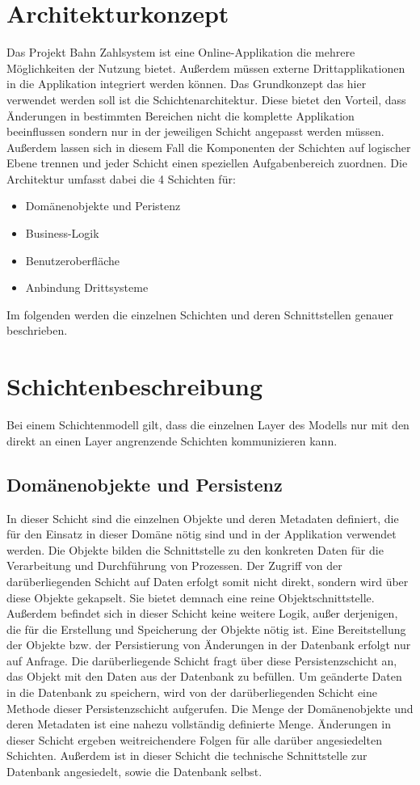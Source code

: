 \documentclass[a4paper,12pt]{article} %
\begin{document}
\section{Architekturkonzept}
Das Projekt \glqq{}Bahn Zahlsystem\grqq{} ist eine Online-Applikation die mehrere Möglichkeiten der Nutzung bietet. Außerdem müssen externe Drittapplikationen in die Applikation integriert werden können. Das Grundkonzept das hier verwendet werden soll ist die Schichtenarchitektur. Diese bietet den Vorteil, dass Änderungen in bestimmten Bereichen nicht die komplette Applikation beeinflussen sondern nur in der jeweiligen Schicht angepasst werden müssen. Außerdem lassen sich in diesem Fall die Komponenten der Schichten auf logischer Ebene trennen und jeder Schicht einen speziellen Aufgabenbereich zuordnen. Die Architektur umfasst dabei die 4 Schichten für:
\begin{itemize}\itemsep2pt
 \item Domänenobjekte und Peristenz
 \item Business-Logik
 \item Benutzeroberfläche
 \item Anbindung Drittsysteme
\end{itemize}
Im folgenden werden die einzelnen Schichten und deren Schnittstellen genauer beschrieben.

\section{Schichtenbeschreibung}
Bei einem Schichtenmodell gilt, dass die einzelnen Layer des Modells nur mit den direkt an einen Layer angrenzende Schichten kommunizieren kann.

\subsection{Domänenobjekte und Persistenz}
In dieser Schicht sind die einzelnen Objekte und deren Metadaten definiert, die für den Einsatz in dieser Domäne nötig sind und in der Applikation verwendet werden. Die Objekte bilden die Schnittstelle zu den konkreten Daten für die Verarbeitung und Durchführung von Prozessen. Der Zugriff von der darüberliegenden Schicht auf Daten erfolgt somit nicht direkt, sondern wird über diese Objekte gekapselt. Sie bietet demnach eine reine Objektschnittstelle. Außerdem befindet sich in dieser Schicht keine weitere Logik, außer derjenigen, die für die Erstellung und Speicherung der Objekte nötig ist.\newline
Eine Bereitstellung der Objekte bzw. der Persistierung von Änderungen in der Datenbank erfolgt nur auf Anfrage. Die darüberliegende Schicht fragt über diese Persistenzschicht an, das Objekt mit den Daten aus der Datenbank zu befüllen. Um geänderte Daten in die Datenbank zu speichern, wird von der darüberliegenden Schicht eine Methode dieser Persistenzschicht aufgerufen.\newline
Die Menge der Domänenobjekte und deren Metadaten ist eine nahezu vollständig definierte Menge. Änderungen in dieser Schicht ergeben weitreichendere Folgen für alle darüber angesiedelten Schichten. Außerdem ist in dieser Schicht die technische Schnittstelle zur Datenbank angesiedelt, sowie die Datenbank selbst.
\end{document}
